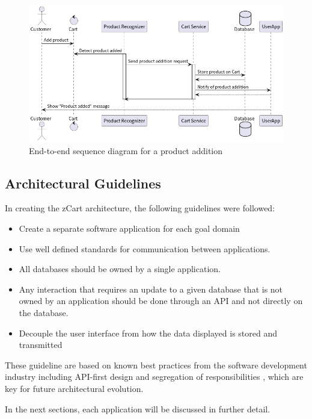 \documentclass[openright]{normas-utf-tex} %
\begin{document}
\begin{figure}[H]
	\centering
	\includegraphics[width=1\textwidth]{./images/E2E.png}
	\caption[End-to-end sequence diagram for a product addition]{End-to-end sequence diagram for a product addition}
	\label{fig:e2eseq}
\end{figure}

\subsection{Architectural Guidelines}
In creating the zCart architecture, the following guidelines were followed:

\begin{itemize}
    \item Create a separate software application for each goal domain
    \item Use well defined standards for communication between applications.
    \item All databases should be owned by a single application. 
    \item Any interaction that requires an update to a given database that is
        not owned by an application should be done through an API and not
        directly on the database.
    \item Decouple the user interface from how the data displayed is stored and transmitted
\end{itemize}

These guideline are based on known best practices from the software 
development industry including API-first design and segregation of
responsibilities \cite{Sam2021,Kong2022}, which are key for future architectural
evolution.

In the next sections, each application will be discussed in further detail.
\end{document}
